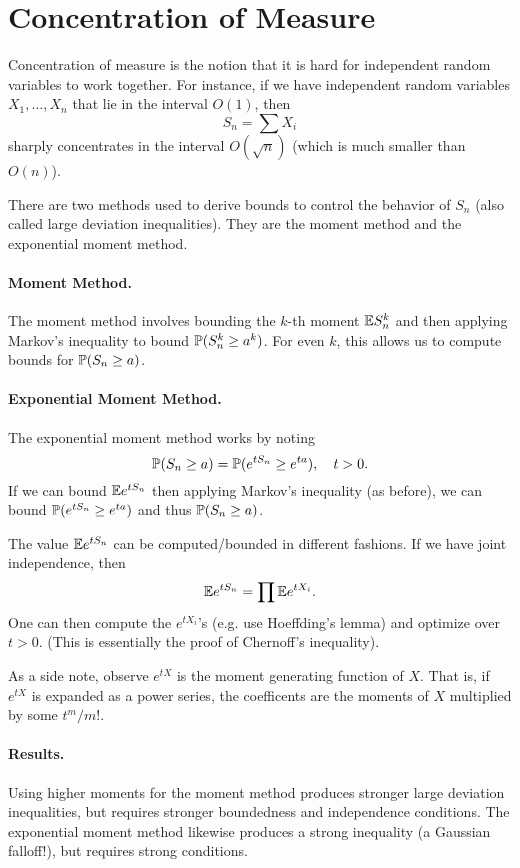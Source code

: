\section*{Concentration of Measure}

Concentration of measure is the notion that it is hard for independent random variables to work together. For instance, if we have independent random variables $X_1, \dots, X_n$ that lie in the interval $O(1)$, then
\[
    S_n = \sum X_i
\]
sharply concentrates in the interval $O(\sqrt{n})$ (which is much smaller than $O(n)$).

There are two methods used to derive bounds to control the behavior of $S_n$ (also called large deviation inequalities). They are the moment method and the exponential moment method.

\paragraph{Moment Method.} The moment method involves bounding the $k$-th moment ${\mathbb E} S_n^k$ and then applying Markov's inequality to bound ${\mathbb P}(S_n^k \geq a^k)$. For even $k$, this allows us to compute bounds for ${\mathbb P}(S_n \geq a)$.

\paragraph{Exponential Moment Method.} The exponential moment method works by noting
\[
    {\mathbb P}(S_n \geq a) = {\mathbb P}( e^{tS_n} \geq e^{ta}), \quad t > 0.
\]
If we can bound ${\mathbb E} e^{tS_n}$ then applying Markov's inequality (as before), we can bound ${\mathbb P}( e^{tS_n} \geq e^{ta})$ and thus ${\mathbb P}(S_n \geq a)$.

The value ${\mathbb E} e^{tS_n}$ can be computed/bounded in different fashions. If we have joint independence, then
\[
    {\mathbb E} e^{tS_n} = \prod {\mathbb E} e^{tX_i}.
\]
One can then compute the $e^{tX_i}$'s (e.g. use Hoeffding's lemma) and optimize over $t > 0$. (This is essentially the proof of Chernoff's inequality).

As a side note, observe $e^{tX}$ is the moment generating function of $X$. That is, if $e^{tX}$ is expanded as a power series, the coefficents are the moments of $X$ multiplied by some $t^m/m!$.

\paragraph{Results.} Using higher moments for the moment method produces stronger large deviation inequalities, but requires stronger boundedness and independence conditions. The exponential moment method likewise produces a strong inequality (a Gaussian falloff!), but requires strong conditions.

